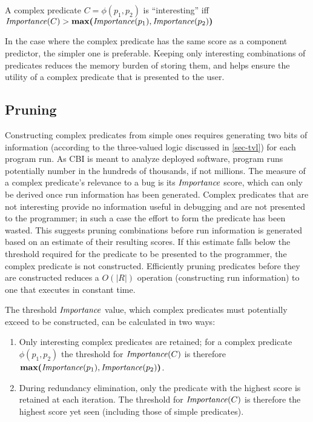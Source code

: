 \begin{defn}
\label{dfn3}
A complex predicate $C = \phi(p_1, p_2)$ is ``interesting'' iff $\mathit{Importance}(C) > \textbf{max(}\mathit{Importance}(p_1), \mathit{Importance}(p_2)\textbf{)}$
\end{defn}

In the case where the complex predicate has the same score as a component predictor, the simpler one is preferable.  Keeping only interesting combinations of predicates reduces the memory burden of storing them, and helps ensure the utility of a complex predicate that is presented to the user.

\subsection{Pruning}
\label{sec-pruning}
Constructing complex predicates from simple ones requires generating two bits of information (according to the three-valued logic discussed in \autoref{sec-tvl}) for each program run.  As CBI is meant to analyze deployed software, program runs potentially number in the hundreds of thousands, if not millions.  The measure of a complex predicate's relevance to a bug is its $\mathit{Importance}$ score, which can only be derived once run information has been generated.  Complex predicates that are not interesting provide no information useful in debugging and are not presented to the programmer; in such a case the effort to form the predicate has been wasted.  This suggests pruning combinations before run information is generated based on an estimate of their resulting scores.  If this estimate falls below the threshold required for the predicate to be presented to the programmer, the complex predicate is not constructed.  Efficiently pruning predicates before they are constructed reduces a $O(|R|)$ operation (constructing run information) to one that executes in constant time.

The threshold $\mathit{Importance}$ value, which complex predicates must potentially exceed to be constructed, can be calculated in two ways:
\begin{enumerate}
\item Only interesting complex predicates are retained; for a complex predicate $\phi(p_1, p_2)$ the threshold for $\mathit{Importance}(C)$ is therefore $\textbf{max(}\mathit{Importance}(p_1), \mathit{Importance}(p_2)\textbf{)}$.
\item During redundancy elimination, only the predicate with the highest score is retained at each iteration.  The threshold for $\mathit{Importance}(C)$ is therefore the highest score yet seen (including those of simple predicates).
\end{enumerate}

